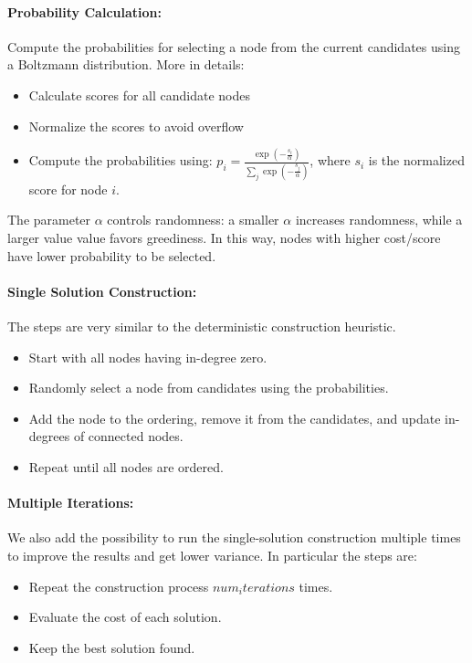 \documentclass{article}
\begin{document}
\paragraph{Probability Calculation:}
Compute the probabilities for selecting a node from the current candidates using a Boltzmann distribution. More in details:
\begin{itemize}
    \item Calculate scores for all candidate nodes
    \item Normalize the scores to avoid overflow
    \item Compute the probabilities using: 
    \(p_i = \frac{\exp{(-\frac{s_i}{\alpha})}}{\sum_j \exp{(-\frac{s_j}{\alpha})}}\), where \(s_i\) is the normalized score for node \( i\).
\end{itemize}
The parameter $\alpha$ controls randomness: a smaller $\alpha$ increases randomness, while a larger value value favors greediness.
In this way, nodes with higher cost/score have lower probability to be selected.

\paragraph{Single Solution Construction:}
The steps are very similar to the deterministic construction heuristic.
\begin{itemize}
    \item Start with all nodes having in-degree zero.
    \item Randomly select a node from candidates using the probabilities.
    \item Add the node to the ordering, remove it from the candidates, and update in-degrees of connected nodes.
    \item Repeat until all nodes are ordered.
\end{itemize}


\paragraph{Multiple Iterations:}
We also add the possibility to run the single-solution construction multiple times to improve the results and get lower variance. In particular the steps are:
\begin{itemize}
    \item Repeat the construction process $num_iterations$ times.
    \item Evaluate the cost of each solution.
    \item Keep the best solution found.
\end{itemize}
\end{document}
